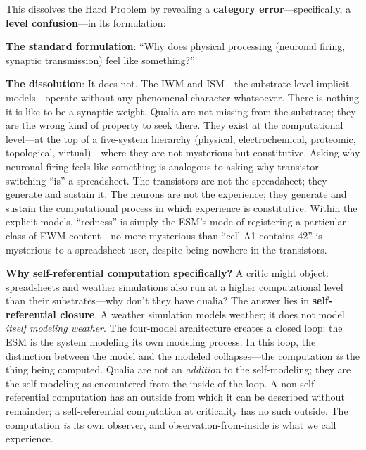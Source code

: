 \documentclass[12pt]{article}
\begin{document}
This dissolves the Hard Problem by revealing a \textbf{category error}---\hspace{0pt}specifically, a \textbf{level confusion}---\hspace{0pt}in its formulation:

\textbf{The standard formulation}: ``Why does physical processing (neuronal firing, synaptic transmission) feel like something?''

\textbf{The dissolution}: It does not. The IWM and ISM---\hspace{0pt}the substrate-level implicit models---\hspace{0pt}operate without any phenomenal character whatsoever. There is nothing it is like to be a synaptic weight. Qualia are not missing from the substrate; they are the wrong kind of property to seek there. They exist at the computational level---\hspace{0pt}at the top of a five-system hierarchy (physical, electrochemical, proteomic, topological, virtual)---\hspace{0pt}where they are not mysterious but constitutive. Asking why neuronal firing feels like something is analogous to asking why transistor switching ``is'' a spreadsheet. The transistors are not the spreadsheet; they generate and sustain it. The neurons are not the experience; they generate and sustain the computational process in which experience is constitutive. Within the explicit models, ``redness'' is simply the ESM's mode of registering a particular class of EWM content---\hspace{0pt}no more mysterious than ``cell A1 contains 42'' is mysterious to a spreadsheet user, despite being nowhere in the transistors.

\textbf{Why self-referential computation specifically?} A critic might object: spreadsheets and weather simulations also run at a higher computational level than their substrates---\hspace{0pt}why don't they have qualia? The answer lies in \textbf{self-referential closure}. A weather simulation models weather; it does not model \emph{itself modeling weather}. The four-model architecture creates a closed loop: the ESM is the system modeling its own modeling process. In this loop, the distinction between the model and the modeled collapses---\hspace{0pt}the computation \emph{is} the thing being computed. Qualia are not an \emph{addition} to the self-modeling; they are the self-modeling as encountered from the inside of the loop. A non-self-referential computation has an outside from which it can be described without remainder; a self-referential computation at criticality has no such outside. The computation \emph{is} its own observer, and observation-from-inside is what we call experience.
\end{document}
